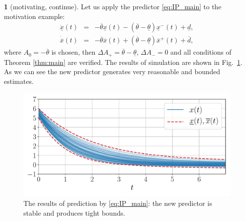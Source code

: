 \documentclass[letterpaper, 10 pt, conference]{ieeeconf}
\theoremstyle{plain}
\theoremstyle{definition}
\newtheorem*{example*}{\protect\examplename}
\theoremstyle{plain}
\theoremstyle{plain}
\theoremstyle{remark}
\providecommand{\examplename}{Example}
\begin{document}
\begin{example*}
[motivating, continue] Let us apply the predictor \eqref{eq:IP_main}
to the motivation example:
\begin{eqnarray*}
\dot{\underline{x}}(t) & = & -\overline{\theta}\underline{x}(t)-(\overline{\theta}-\underline{\theta})\underline{x}^{-}(t)+\underline{d},\\
\dot{\overline{x}}(t) & = & -\overline{\theta}\overline{x}(t)+(\overline{\theta}-\underline{\theta})\overline{x}^{+}(t)+\overline{d},
\end{eqnarray*}
where $A_{0}=-\overline{\theta}$ is chosen, then $\Delta A_{+}=\overline{\theta}-\underline{\theta}$, $\Delta A_{-}=0$ and all conditions of Theorem \ref{thm:main} are verified. The results of simulation are shown in Fig.~\ref{fig:IP_New}. As we can see the new predictor generates very reasonable and bounded estimates. 
\begin{figure}
\begin{centering}
\includegraphics[width=\linewidth]{predictor-2}
\par\end{centering}
\caption{\label{fig:IP_New} The results of prediction by \eqref{eq:IP_main}: the new predictor is stable and produces tight bounds.}
\end{figure}
\end{example*}
\end{document}
